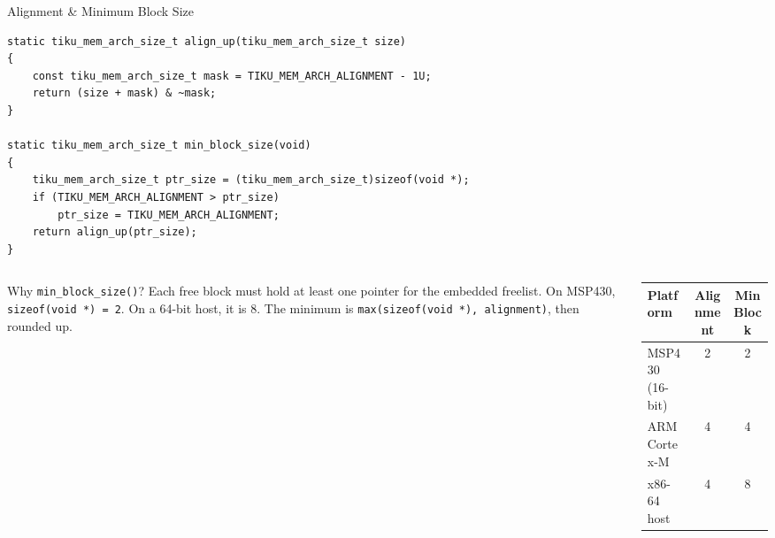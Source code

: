 \documentclass[aspectratio=169, 10pt]{beamer}
\begin{document}
\begin{frame}[fragile]{Alignment \& Minimum Block Size}
\begin{lstlisting}[style=cstyle, title={kernel/memory/tiku\_pool.c (private helpers)}]
static tiku_mem_arch_size_t align_up(tiku_mem_arch_size_t size)
{
    const tiku_mem_arch_size_t mask = TIKU_MEM_ARCH_ALIGNMENT - 1U;
    return (size + mask) & ~mask;
}

static tiku_mem_arch_size_t min_block_size(void)
{
    tiku_mem_arch_size_t ptr_size = (tiku_mem_arch_size_t)sizeof(void *);
    if (TIKU_MEM_ARCH_ALIGNMENT > ptr_size)
        ptr_size = TIKU_MEM_ARCH_ALIGNMENT;
    return align_up(ptr_size);
}
\end{lstlisting}

\vspace{0.3em}
\begin{columns}[T]
\begin{column}{0.48\textwidth}
\begin{block}{Why \texttt{min\_block\_size()}?}
Each free block must hold at least one pointer for the embedded
freelist. On MSP430, \texttt{sizeof(void *) = 2}. On a 64-bit host,
it is 8. The minimum is \texttt{max(sizeof(void *), alignment)},
then rounded up.
\end{block}
\end{column}
\begin{column}{0.48\textwidth}
\begin{table}
\centering
\small
\begin{tabular}{@{}lcc@{}}
\toprule
\textbf{Platform} & \textbf{Alignment} & \textbf{Min Block} \\
\midrule
MSP430 (16-bit) & 2 & 2 \\
ARM Cortex-M    & 4 & 4 \\
x86-64 host     & 4 & 8 \\
\bottomrule
\end{tabular}
\end{table}
\end{column}
\end{columns}
\end{frame}
\end{document}
